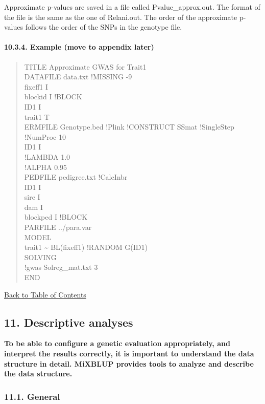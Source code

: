 Approximate p-values are saved in a file called Pvalue\_approx.out. The
format of the file is the same as the one of Relani.out. The order of
the approximate p-values follows the order of the SNPs in the genotype
file.

\paragraph{10.3.4. Example (move to appendix later)}\label{MTGW12}

\begin{quote}
TITLE Approximate GWAS for Trait1\\
DATAFILE data.txt !MISSING -9\\
fixeff1 I\\
blockid I !BLOCK\\
ID1 I\\
trait1 T\\
ERMFILE Genotype.bed !Plink !CONSTRUCT SSmat !SingleStep !NumProc 10\\
ID1 I\\
!LAMBDA 1.0\\
!ALPHA 0.95\\
PEDFILE pedigree.txt !CalcInbr\\
ID1 I\\
sire I\\
dam I\\
blockped I !BLOCK\\
PARFILE ../para.var\\
MODEL\\
trait1 \textasciitilde{} BL(fixeff1) !RANDOM G(ID1)\\
SOLVING\\
!gwas Solreg\_mat.txt 3\\
END
\end{quote}

\hyperref[Tabl01]{Back to Table of Contents}

\newpage

\subsection{11. Descriptive analyses}\label{Desc01}

\textbf{To be able to configure a genetic evaluation appropriately, and
interpret the results correctly, it is important to understand the data
structure in detail. MiXBLUP provides tools to analyze and describe the
data structure.}

\subsubsection{11.1. General}\label{Desc02}

